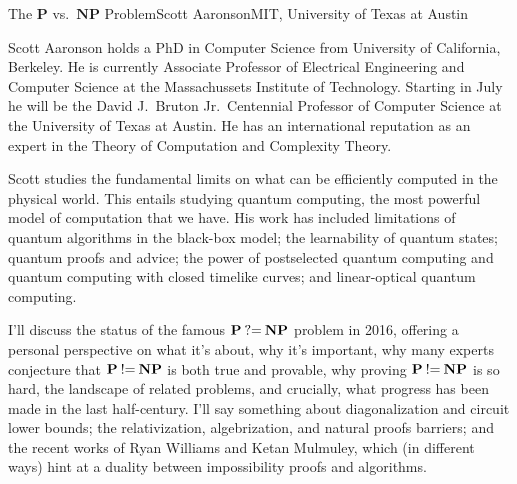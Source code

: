 \documentclass{hrumc}
\begin{document}
\vspace*{5ex}
\begin{plenary}{The $\mathbf{P}$ vs.\ $\mathbf{NP}$ Problem}{Scott Aaronson}{MIT, University of Texas at Austin}{Scott Aaronson 
holds a PhD in Computer Science from University of California, Berkeley.
He is currently Associate Professor of Electrical Engineering and 
Computer Science
at the Massachussets Institute of Technology. 
Starting in July he will be the 
David J.~Bruton Jr.\ Centennial Professor of Computer Science at the 
University of Texas at Austin. 
He has an international reputation as an expert in the Theory of Computation 
and Complexity Theory.

Scott studies the fundamental limits on what can be efficiently computed in the physical world. This entails studying quantum computing, the most powerful model of computation that we have. His work has included limitations of quantum algorithms in the black-box model; the learnability of quantum states; quantum proofs and advice; the power of postselected quantum computing and quantum computing with closed timelike curves; and linear-optical quantum computing.}

I'll discuss the status of the famous $\mathbf{P}\mathbin{\hbox{?=}}\mathbf{NP}$ 
problem in 2016, offering
a personal perspective on what it's about, why it's important, why
many experts conjecture that $\mathbf{P}\mathbin{\hbox{!=}}\mathbf{NP}$ is both true and provable, why
proving $\mathbf{P}\mathbin{\hbox{!=}}\mathbf{NP}$ is so hard, the landscape of related problems, and
crucially, what progress has been made in the last half-century.  I'll
say something about diagonalization and circuit lower bounds; the
relativization, algebrization, and natural proofs barriers; and the
recent works of Ryan Williams and Ketan Mulmuley, which (in different
ways) hint at a duality between impossibility proofs and algorithms.
\end{plenary}
\vspace*{1ex plus 1fill}


\restoregeometry







\end{document}

